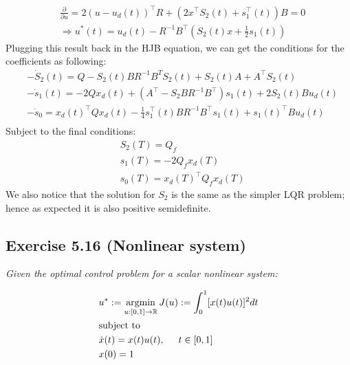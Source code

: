 \begin{align}
    &\frac{\partial}{\partial u} = 2(u - u_d(t))^{\top} R + (2x^{\top} S_2(t) + s_1 ^{\top} (t))B = 0\\
    &\Longrightarrow u^*(t) = u_d(t) - R^{-1}B^{\top} \left( S_2(t) x + \frac{1}{2} s_1(t) \right)
\end{align}
Plugging this result back in the HJB equation, we can get the conditions for the coefficients as following:
\begin{align}
    &-\dot{S}_2(t) = Q - S_2(t) B R^{-1}B^T S_2(t) + S_2(t) A + A^{\top}S_2(t)\\
    &-\dot{s}_1(t) = -2 Q x_d(t) + (A^{\top} - S_2 B R^{-1} B^{\top} ) s_1(t) + 2S_2(t) B u_d(t)\\
    &-\dot{s}_0 = x_d(t)^{\top} Q x_d(t) - \frac{1}{4}s_1^{\top}(t) B R^{-1} B^{\top} s_1(t) + s_1(t)^{\top} B u_d(t)\\
\end{align}
Subject to the final conditions:
\begin{align}
    &S_2(T) = Q_f\\
    &s_1(T) = -2Q_f x_d(T)\\
    &s_0(T) = x_d(T)^{\top} Q_f x_d(T)
\end{align}
We also notice that the solution for $S_2$ is the same as the simpler LQR problem; hence as expected it is also positive semidefinite.


\subsection{Exercise 5.16 (Nonlinear system)}
\emph{Given the optimal control problem for a scalar nonlinear system:}

\begin{align}
    &u^* := \operatorname*{argmin}_{u:[0,1] \to \mathbb{R}} J(u) := \int_0^1 [x(t)u(t)]^2 dt \\
    &\text{subject to}\\
    &\Dot{x}(t) = x(t)u(t), \hspace{0.5cm} t \in [0,1] \\
    &x(0) =1
\end{align}


